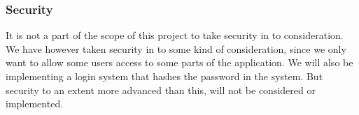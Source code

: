 \subsubsection{Security}
It is not a part of the scope of this project to take security in to consideration. We have however taken security in to some kind of consideration, since we only want to allow some users access to some parts of the application. We will also be implementing a login system that hashes the password in the system. But security to an extent more advanced than this, will not be considered or implemented.
